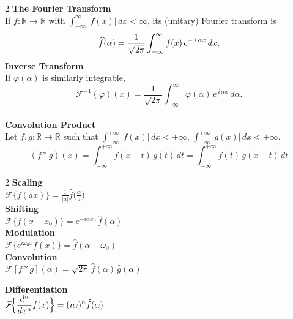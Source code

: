 \documentclass[8pt]{article}
\begin{document}
\begin{multicols}{2}
	\noindent \textbf{The Fourier Transform}\\
	If $f:\mathbb{R}\to\mathbb{R}$ with $\int_{-\infty}^{\infty}\!|f(x)|\,dx<\infty$, its (unitary) Fourier transform is
	\[
		\widehat{f}(\alpha)=\frac{1}{\sqrt{2\pi}}
		\int_{-\infty}^{\infty} f(x)\, e^{-\,i\,\alpha x}\,dx, \vspace{-10px}
	\]
	\noindent \textbf{Inverse Transform}\\
	If $\varphi(\alpha)$ is similarly integrable,
	\[
		\mathcal{F}^{-1}(\varphi)(x)= \frac{1}{\sqrt{2\pi}}
		\int_{-\infty}^{\infty}\!\varphi(\alpha)\,e^{\,i\,\alpha x}\,d\alpha.
	\]\\[-7px]
	\noindent \textbf{Convolution Product}\\
	Let \(f,g:\mathbb{R} \to \mathbb{R}\) such that
	\(\int_{-\infty}^{+\infty} |f(x)|\,dx < +\infty\),
	\(\int_{-\infty}^{+\infty} |g(x)|\,dx < +\infty\). \vspace{-5px}
	\[
		(f * g)(x)
		= \int_{-\infty}^{+\infty} f(x - t)\,g(t)\,dt
		= \int_{-\infty}^{+\infty} f(t)\,g(x - t)\,dt
	\]

	\setlength{\columnsep}{-70pt} %
	\vspace*{-5px}
	\hspace{-15px}
	\normalsize
	\begin{minipage}[htp]{0.55\textwidth}
		\begin{multicols}{2}
			\textbf{Scaling} \\
			$\mathcal{F}\{f(ax)\} = \frac{1}{|a|} \hat{f}\!\bigl(\tfrac{\alpha}{a}\bigr)$ \\[4pt]

			\textbf{Shifting} \\
			$\mathcal{F}\{f(x - x_0)\} = e^{-i\alpha x_0}\,\hat{f}(\alpha)$ \\[4pt]

			\textbf{Modulation} \\
			$\mathcal{F}\{e^{i\omega_0 x} f(x)\} = \hat{f}(\alpha - \omega_0)$ \\[4pt]

			\textbf{Convolution} \\
			$\mathcal{F}[f * g](\alpha)
				= \sqrt{2\pi} \,\hat{f}(\alpha)\,\hat{g}(\alpha)$ \\[4pt]
			\columnbreak

			\textbf{Differentiation} \\[2pt]
			$\mathcal{F}\!\Bigl\{\dfrac{d^n}{dx^n}f(x)\Bigr\} = (i\alpha)^n \hat{f}(\alpha)$ \\[4pt]


\end{multicols}
\end{minipage}
\end{multicols}
\end{document}
